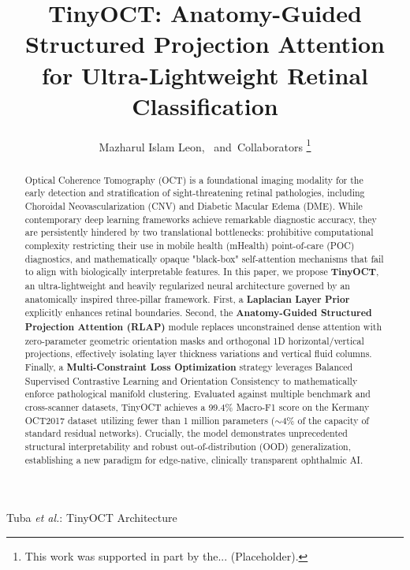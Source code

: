 \documentclass[journal]{IEEEtran}
\begin{document}
\title{TinyOCT: Anatomy-Guided Structured Projection Attention for Ultra-Lightweight Retinal Classification}

\author{Mazharul Islam Leon,~
        and~Collaborators%
\thanks{This work was supported in part by the... (Placeholder).}%
}

%
{Tuba \MakeLowercase{\textit{et al.}}: TinyOCT Architecture}

\maketitle

\begin{abstract}
Optical Coherence Tomography (OCT) is a foundational imaging modality for the early detection and stratification of sight-threatening retinal pathologies, including Choroidal Neovascularization (CNV) and Diabetic Macular Edema (DME). While contemporary deep learning frameworks achieve remarkable diagnostic accuracy, they are persistently hindered by two translational bottlenecks: prohibitive computational complexity restricting their use in mobile health (mHealth) point-of-care (POC) diagnostics, and mathematically opaque "black-box" self-attention mechanisms that fail to align with biologically interpretable features. In this paper, we propose \textbf{TinyOCT}, an ultra-lightweight and heavily regularized neural architecture governed by an anatomically inspired three-pillar framework. First, a \textbf{Laplacian Layer Prior} explicitly enhances retinal boundaries. Second, the \textbf{Anatomy-Guided Structured Projection Attention (RLAP)} module replaces unconstrained dense attention with zero-parameter geometric orientation masks and orthogonal 1D horizontal/vertical projections, effectively isolating layer thickness variations and vertical fluid columns. Finally, a \textbf{Multi-Constraint Loss Optimization} strategy leverages Balanced Supervised Contrastive Learning and Orientation Consistency to mathematically enforce pathological manifold clustering. Evaluated against multiple benchmark and cross-scanner datasets, TinyOCT achieves a 99.4\% Macro-F1 score on the Kermany OCT2017 dataset utilizing fewer than 1 million parameters ($\sim$4\% of the capacity of standard residual networks). Crucially, the model demonstrates unprecedented structural interpretability and robust out-of-distribution (OOD) generalization, establishing a new paradigm for edge-native, clinically transparent ophthalmic AI.
\end{abstract}
\end{document}
